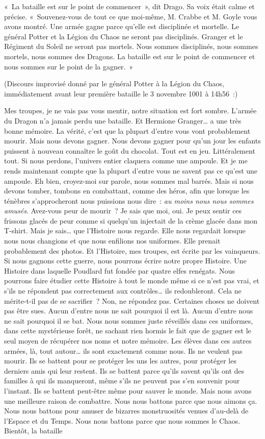 «~La bataille est sur le point de commencer~», dit Drago. Sa voix était calme et précise. «~Souvenez-vous de tout ce que moi-même, M. Crabbe et M. Goyle vous avons montré. Une armée gagne parce qu'elle est disciplinée et mortelle. Le général Potter et la Légion du Chaos ne seront pas disciplinés. Granger et le Régiment du Soleil ne seront pas mortels. Nous sommes disciplinés, nous sommes mortels, nous sommes des Dragons. La bataille est sur le point de commencer et nous sommes sur le point de la gagner.~»

\later

(Discours improvisé donné par le général Potter à la Légion du Chaos, immédiatement avant leur première bataille le 3 novembre 1001 à 14h56~:)

Mes troupes, je ne vais pas vous mentir, notre situation est fort sombre. L'armée du Dragon n'a jamais perdu une bataille. Et Hermione Granger… a une très bonne mémoire. La vérité, c'est que la plupart d'entre vous vont probablement mourir. Mais nous devons gagner. Nous devons gagner pour qu'un jour les enfants puissent à nouveau connaître le goût du chocolat. Tout est en jeu. Littéralement tout. Si nous perdons, l'univers entier claquera comme une ampoule. Et je me rends maintenant compte que la plupart d'entre vous ne savent pas ce qu'est une ampoule. Eh bien, croyez-moi sur parole, nous sommes mal barrés. Mais si nous devons tomber, tombons en combattant, comme des héros, afin que lorsque les ténèbres s'approcheront nous puissions nous dire~: \emph{au moins nous nous sommes amusés}. Avez-vous peur de mourir~? Je sais que moi, oui. Je peux sentir ces frissons glacés de peur comme si quelqu'un injectait de la crème glacée dans mon T-shirt. Mais je sais… que l'Histoire nous regarde. Elle nous regardait lorsque nous nous changions et que nous enfilions nos uniformes. Elle prenait probablement des photos. Et l'Histoire, mes troupes, est écrite par les vainqueurs. Si nous gagnons cette guerre, nous pourrons écrire notre propre Histoire. Une Histoire dans laquelle Poudlard fut fondée par quatre elfes renégats. Nous pourrons faire étudier cette Histoire à tout le monde même si ce n'est pas vrai, et s'ils ne répondent pas correctement aux contrôles… ils redoubleront. Cela ne mérite-t-il pas de se sacrifier~? Non, ne répondez pas. Certaines choses ne doivent pas être sues. Aucun d'entre nous ne sait pourquoi il est là. Aucun d'entre nous ne sait pourquoi il se bat. Nous nous sommes juste réveillés dans ces uniformes, dans cette mystérieuse forêt, ne sachant rien hormis le fait que de gagner est le seul moyen de récupérer nos noms et notre mémoire. Les élèves dans ces autres armées, là, tout autour… ils sont exactement comme nous. Ils ne veulent pas mourir. Ils se battent pour se protéger les uns les autres, pour protéger les derniers amis qui leur restent. Ils se battent parce qu'ils savent qu'ils ont des familles à qui ils manqueront, même s'ils ne peuvent pas s'en souvenir pour l'instant. Ils se battent peut-être même pour sauver le monde. Mais nous avons une meilleure raison de combattre. Nous nous battons parce que nous aimons ça. Nous nous battons pour amuser de bizarres monstruosités venues d'au-delà de l'Espace et du Temps. Nous nous battons parce que nous sommes le Chaos. Bientôt, la bataille 